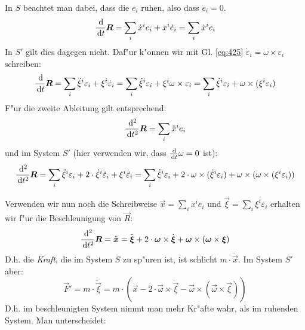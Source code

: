 In $S$ beachtet man dabei, dass die $e_i$ ruhen, also dass $\dot e_i = 0$.
\begin{equation*}
   \frac{\, \mathrm{d} }{\, \mathrm{d} t}\boldsymbol{R} = \sum_i \dot x^i e_i + x^i \dot e_i =
   \sum_i \dot x^i e_i
\end{equation*}
In $S'$ gilt dies dagegen nicht. Daf"ur k"onnen wir mit
Gl. \eqref{eq:425} $\dot \varepsilon_i = \omega \times \varepsilon_i$
schreiben:
\begin{equation*}
   \frac{\, \mathrm{d} }{\, \mathrm{d} t} \boldsymbol{R} = \sum_i \dot \xi^i \varepsilon_i +
   \xi^i \dot \varepsilon_i = 
\sum_i \dot \xi^i \varepsilon_i +
   \xi^i \omega \times \varepsilon_i =
\sum_i \dot \xi^i \varepsilon_i +
    \omega \times (\xi^i \varepsilon_i )
\end{equation*}
F"ur die zweite Ableitung gilt entsprechend:
\begin{equation*}
   \frac{\, \mathrm{d} ^2}{\, \mathrm{d} t^2} \boldsymbol{R} = \sum_i \ddot x^i e_i
\end{equation*}
und im System $S'$ (hier verwenden wir, dass $\frac{\, \mathrm{d} }{\, \mathrm{d} t}
\omega = 0$ ist):
\begin{equation*}
     \frac{\, \mathrm{d} ^2}{\, \mathrm{d} t^2} \boldsymbol{R} =
\sum_i \ddot \xi^i\varepsilon_i + 2 \cdot \dot \xi^i \dot \varepsilon_i +
\xi^i\ddot \varepsilon_i =
\sum_i \ddot \xi^i\varepsilon_i + 2 \cdot \omega \times (\dot \xi^i  \varepsilon_i) +
\omega \times (\omega \times (\xi^i \varepsilon_i ))
\end{equation*}

Verwenden wir nun noch die Schreibweise $\vec x = \sum_i x^ie_i$ und
$\vec \xi = \sum_i \xi^i \varepsilon_i$ erhalten wir f"ur die
Beschleunigung von $\vec R$:
\begin{equation}
   \label{eq:426}
   \frac{\, \mathrm{d} ^2}{\, \mathrm{d} t^2} \boldsymbol{R} = \ddot{ \boldsymbol{x}} = \ddot{\boldsymbol{\xi}} + 2 \cdot \boldsymbol{\omega} \times \dot{\boldsymbol{\xi}} + \boldsymbol{\omega} \times (
   \boldsymbol{\omega} \times \boldsymbol{\xi})
\end{equation}
D.h. die \emph{Kraft}, die im System $S$ zu sp"uren ist, ist schlicht
$ m \cdot \ddot{\vec x}$. Im System $S'$ aber:
\begin{equation}
   \label{eq:427}
   \vec F' = m \cdot  \ddot{\vec \xi} = m \cdot \left (\ddot{\vec x} -   2 \cdot \vec \omega \times \dot{\vec \xi} - \vec \omega \times (
   \vec \omega \times \vec \xi) \right )
\end{equation}
D.h. im beschleunigten System nimmt man mehr Kr"afte wahr, als im
ruhenden System. Man unterscheidet:


